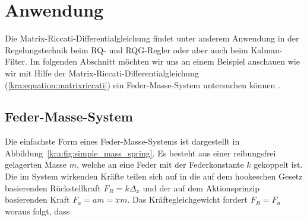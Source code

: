 \section{Anwendung
\label{kra:section:anwendung}}

Die Matrix-Riccati-Differentialgleichung findet unter anderem
Anwendung in der Regelungstechnik beim RQ- und RQG-Regler oder aber
auch beim Kalman-Filter.
Im folgenden Abschnitt möchten wir uns an einem Beispiel anschauen
wie wir mit Hilfe der Matrix-Riccati-Differentialgleichung
(\ref{kra:equation:matrixriccati}) ein Feder-Masse-System untersuchen
können \cite{kra:riccati}.

\subsection{Feder-Masse-System}
\label{kra:subsection:feder-masse-system}
Die einfachste Form eines Feder-Masse-Systems ist dargestellt in
Abbildung~\ref{kra:fig:simple_mass_spring}.
Es besteht aus einer reibungsfrei gelagerten Masse $m$, welche an
eine Feder mit der Federkonstante $k$ gekoppelt ist.
Die im System wirkenden Kräfte teilen sich auf in die auf dem
hookeschen Gesetz basierenden Rückstellkraft $F_R = k \Delta_x$ und
der auf dem Aktionsprinzip basierenden Kraft $F_a = am = \ddot{x}
m$.
Das Kräftegleichgewicht fordert $F_R = F_a$ woraus folgt, dass

